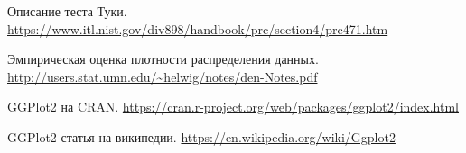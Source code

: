 \documentclass{article}
\begin{document}
	

	\begin{thebibliography}{9}
		Описание теста Туки. \url{https://www.itl.nist.gov/div898/handbook/prc/section4/prc471.htm}
		
		Эмпирическая оценка плотности распределения данных. \url{http://users.stat.umn.edu/~helwig/notes/den-Notes.pdf}
		
		GGPlot2 на CRAN. \url{https://cran.r-project.org/web/packages/ggplot2/index.html}
		
		GGPlot2 статья на википедии. \url{https://en.wikipedia.org/wiki/Ggplot2}
	\end{thebibliography}
	
\end{document}
